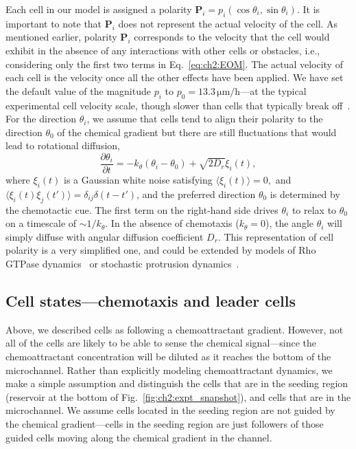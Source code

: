 Each cell in our model is assigned a polarity $\mathbf P_i=p_i(\cos\theta_i,\sin\theta_i)$.
It is important to note that $\mathbf{P}_i$ does not represent the actual velocity of the cell.
As mentioned earlier, polarity $\mathbf{P}_i$ corresponds to the velocity that the cell would exhibit in the absence of any interactions with other cells or obstacles, i.e., considering only the first two terms in Eq.~\eqref{eq:ch2:EOM}.
The actual velocity of each cell is the velocity once all the other effects have been applied.
We have set the default value of the magnitude $p_i$ to $p_0 = 13.3\,\mathrm{\mu m/h}$---at the typical experimental cell velocity scale, though slower than cells that typically break off~\cite{law2023cytokinesis}.
For the direction $\theta_i$, we assume that cells tend to align their polarity to the direction $\theta_0$ of the chemical gradient but there are still fluctuations that would lead to rotational diffusion,
\begin{equation}\label{eq:ch2:OU}
    \frac{\partial\theta_i}{\partial t}=-k_\theta(\theta_i-\theta_0)+\sqrt{2D_r}\xi_i(t),
\end{equation}
where $\xi_i(t)$ is a Gaussian white noise satisfying $\langle\xi_i(t)\rangle=0,$ and $\langle\xi_i(t)\xi_j(t')\rangle=\delta_{ij}\delta(t-t')$, and the preferred direction $\theta_0$ is determined by the chemotactic cue.
The first term on the right-hand side drives $\theta_i$ to relax to $\theta_0$ on a timescale of $\sim 1/k_\theta$.
In the absence of chemotaxis ($k_\theta = 0$), the angle $\theta_i$ will simply diffuse with angular diffusion coefficient $D_r$.
This representation of cell polarity is a very simplified one, and could be extended by models of Rho GTPase dynamics~\cite{kulawiak2016modeling, perez2024deposited} or stochastic protrusion dynamics~\cite{zadeh2024inferring}.


\subsection{Cell states---chemotaxis and leader cells}
\label{sec:ch2:states}

Above, we described cells as following a chemoattractant gradient.
However, not all of the cells are likely to be able to sense the chemical signal---since the chemoattractant concentration will be diluted as it reaches the bottom of the microchannel.
Rather than explicitly modeling chemoattractant dynamics, we make a simple assumption and distinguish the cells that are in the seeding region (reservoir at the bottom of Fig.~\ref{fig:ch2:expt_snapshot}), and cells that are in the microchannel.
We assume cells located in the seeding region are not guided by the chemical gradient---cells in the seeding region are just followers of those guided cells moving along the chemical gradient in the channel.

